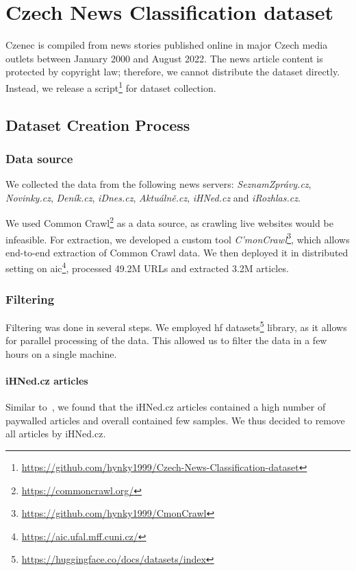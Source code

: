 \chapter{Czech News Classification dataset}
\label{chap:dataset}
\acf{Czenec} is compiled from news stories published online in major Czech media
outlets between January 2000 and August 2022. The news article content is
protected by copyright law; therefore, we cannot distribute the dataset directly.
Instead, we release a script\footnote{\url{https://github.com/hynky1999/Czech-News-Classification-dataset}} for
dataset collection.

\section{Dataset Creation Process}
\label{sec:dataset-creation}

\subsection{Data source}
We collected the data from the following news servers: 
\textit{SeznamZprávy.cz}, \textit{Novinky.cz}, \textit{Deník.cz},
\textit{iDnes.cz}, \textit{Aktuálně.cz}, \textit{iHNed.cz} and \textit{iRozhlas.cz}.

We used Common Crawl\footnote{\url{https://commoncrawl.org/}} as a data source,
as crawling live websites would be infeasible.
For extraction, we developed a custom tool \textit{C'monCrawl}\footnote{\url{https://github.com/hynky1999/CmonCrawl}},
which allows end-to-end extraction of Common Crawl data. We then deployed it in distributed
setting on \ac{aic}\footnote{\url{https://aic.ufal.mff.cuni.cz/}},
processed 49.2M URLs and extracted 3.2M articles.
\subsection{Filtering}

Filtering was done in several steps. We employed \ac{hf} datasets\footnote{\url{https://huggingface.co/docs/datasets/index}}
library, as it allows for parallel processing of the data.
This allowed us to filter the data in a few hours on a single machine.

\subsubsection{iHNed.cz articles}
Similar to~\textcite{strakaSumeCzechLargeCzech2018a}, we found that the iHNed.cz articles contained
a high number of paywalled articles and overall contained few samples.
We thus decided to remove all articles by iHNed.cz.

